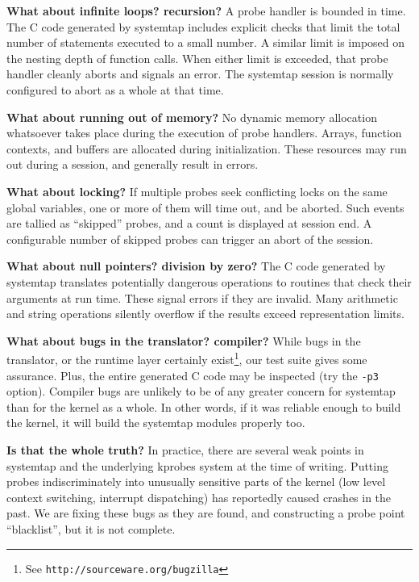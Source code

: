 \documentclass{article}
\renewcommand{\nomenclature}[2]{}
\begin{document}
\begin{description}
\item{\bf What about infinite loops?  recursion?} A probe handler is
bounded in time.  The C code generated by systemtap includes explicit
checks that limit the total number of statements executed to a small
number.  A similar limit is imposed on the nesting depth of function
calls.  When either limit is exceeded, that probe handler cleanly
aborts and signals an error.  The systemtap session is normally
configured to abort as a whole at that time.

\item{\bf What about running out of memory?}  No dynamic memory
allocation whatsoever takes place during the execution of probe
handlers.  Arrays, function contexts, and buffers are allocated during
initialization.  These resources may run out during a session, and
generally result in errors.

\item{\bf What about locking?}  If multiple probes seek conflicting
locks on the same global variables, one or more of them will time out,
and be aborted.  Such events are tallied as ``skipped'' probes, and a
count is displayed at session end.  A configurable number of skipped
probes can trigger an abort of the session.

\item{\bf What about null pointers? division by zero?}  The C code
generated by systemtap translates potentially dangerous operations to
routines that check their arguments at run time.  These signal errors
if they are invalid.  Many arithmetic and string operations silently
overflow if the results exceed representation limits.

\item{\bf What about bugs in the translator?  compiler?}  While bugs
in the translator, or the runtime layer certainly exist\footnote{See
\tt http://sourceware.org/bugzilla}, our test suite gives some
assurance.  Plus, the entire generated C code may be inspected (try
the \verb+-p3+ option).  Compiler bugs are unlikely to be of any
greater concern for systemtap than for the kernel as a whole.  In
other words, if it was reliable enough to build the kernel, it will
build the systemtap modules properly too.

\item{\bf Is that the whole truth?}  In practice, there are several
weak points in systemtap and the underlying kprobes system at the time
of writing.  Putting probes indiscriminately into unusually sensitive
parts of the kernel (low level context switching, interrupt
dispatching) has reportedly caused crashes in the past.  We are
fixing these bugs as they are found, and
constructing a probe point ``blacklist'', but it is not complete.
\nomenclature{blacklist}{A list of probe point patterns encoded into
the translator or the kernel, where probing is prohibited for safety
reasons.}  \nomenclature{kprobes}{A breakpoint dispatching system for
dynamic kernel probes, used by systemtap to implement some families of
probe points.}

\end{description}
\end{document}
